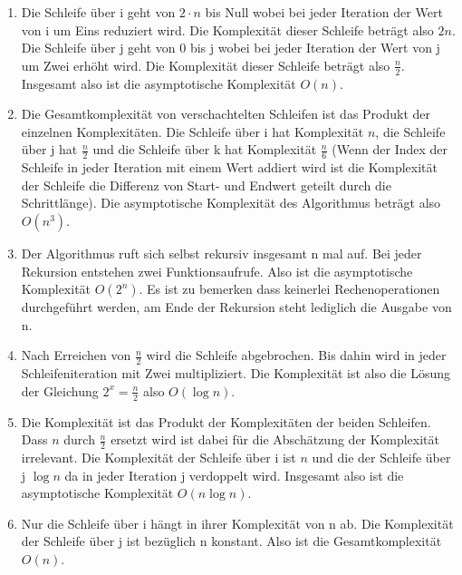 \documentclass[12pt]{scrartcl}
\begin{document}
\exercise{}
\renewcommand{\labelenumii}{\alph{enumii}}
\begin{enumerate}
\item{Die Schleife über i geht von $2 \cdot n$ bis Null wobei bei jeder Iteration der Wert von i um Eins reduziert wird. Die Komplexität dieser Schleife beträgt also $2n$. Die Schleife über j geht von 0 bis j wobei bei jeder Iteration der Wert von j um Zwei erhöht wird. Die Komplexität dieser Schleife beträgt also $\frac{n}{2}$. Insgesamt also ist die asymptotische Komplexität $O(n)$.}

\item{Die Gesamtkomplexität von verschachtelten Schleifen ist das Produkt der einzelnen Komplexitäten. Die Schleife über i hat Komplexität $n$, die Schleife über j hat $\frac{n}{2}$ und die Schleife über k hat Komplexität $\frac{n}{6}$ (Wenn der Index der Schleife in jeder Iteration mit einem Wert addiert wird ist die Komplexität der Schleife die Differenz von Start- und Endwert geteilt durch die \glqq Schrittlänge\grqq). Die asymptotische Komplexität des Algorithmus beträgt also $O(n^3)$.}

\item{Der Algorithmus ruft sich selbst rekursiv insgesamt n mal auf. Bei jeder Rekursion entstehen zwei Funktionsaufrufe. Also ist die asymptotische Komplexität $O(2^n)$. Es ist zu bemerken dass keinerlei Rechenoperationen durchgeführt werden, am Ende der Rekursion steht lediglich die Ausgabe von n.}

\item{Nach Erreichen von $\frac{n}{2}$ wird die Schleife abgebrochen. Bis dahin wird in jeder Schleifeniteration mit Zwei multipliziert. Die Komplexität ist also die Lösung der Gleichung $2^x=\frac{n}{2}$ also $O(\log{n})$.}

\item{Die Komplexität ist das Produkt der Komplexitäten der beiden Schleifen. Dass $n$ durch $\frac{n}{2}$ ersetzt wird ist dabei für die Abschätzung der Komplexität irrelevant. Die Komplexität der Schleife über i ist $n$ und die der Schleife über j $\log{n}$ da in jeder Iteration j verdoppelt wird. Insgesamt also ist die asymptotische Komplexität $O(n\log{n})$.}

\item{Nur die Schleife über i hängt in ihrer Komplexität von n ab. Die Komplexität der Schleife über j ist bezüglich n konstant. Also ist die Gesamtkomplexität $O(n)$.}
\end{enumerate}

\end{document}
